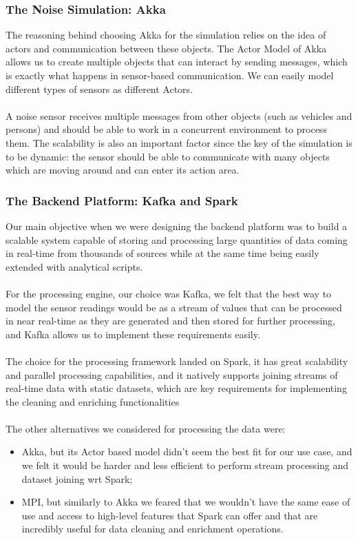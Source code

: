 \documentclass{article}
\begin{document}
\subsubsection{The Noise Simulation: Akka}
The reasoning behind choosing Akka for the simulation relies on the idea of actors and communication between these objects. The Actor Model of Akka allows us to create multiple objects that can interact by sending messages, which is exactly what happens in sensor-based communication. We can easily model different types of sensors as different Actors.
\\
\\
A noise sensor receives multiple messages from other objects (such as vehicles and persons) and should be able to work in a concurrent environment to process them. The scalability is also an important factor since the key of the simulation is to be dynamic: the sensor should be able to communicate with many objects which are moving around and can enter its action area.


\subsubsection{The Backend Platform: Kafka and Spark}
Our main objective when we were designing the backend platform was to build a scalable system capable of storing and processing large quantities of data coming in real-time from thousands of sources while at the same time being easily extended with analytical scripts.
\\
\\
For the processing engine, our choice was Kafka, we felt that the best way to model the sensor readings would be as a stream of values that can be processed in near real-time as they are generated and then stored for further processing, and Kafka allows us to implement these requirements easily.
\\
\\
The choice for the processing framework landed on Spark, it has great scalability and parallel processing capabilities, and it natively supports joining streams of real-time data with static datasets, which are key requirements for implementing the cleaning and enriching functionalities
\\
\\
The other alternatives we considered for processing the data were:
\begin{itemize}
    \item Akka, but its Actor based model didn't seem the best fit for our use case, and we felt it would be harder and less efficient to perform stream processing and dataset joining wrt Spark;
    \item MPI, but similarly to Akka we feared that we wouldn't have the same ease of use and access to high-level features that Spark can offer and that are incredibly useful for data cleaning and enrichment operations.
\end{itemize}
\end{document}
